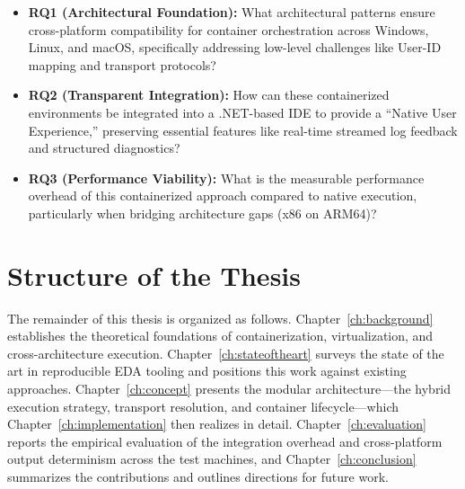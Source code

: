 \begin{itemize}
    \item \textbf{RQ1 (Architectural Foundation):} What architectural patterns ensure cross-platform compatibility for container orchestration across Windows, Linux, and macOS, specifically addressing low-level challenges like User-ID mapping and transport protocols?
    \item \textbf{RQ2 (Transparent Integration):} How can these containerized environments be integrated into a .NET-based IDE to provide a ``Native User Experience,'' preserving essential features like real-time streamed log feedback and structured diagnostics?
    \item \textbf{RQ3 (Performance Viability):} What is the measurable performance overhead of this containerized approach compared to native execution, particularly when bridging architecture gaps (x86 on ARM64)?
\end{itemize}

\section{Structure of the Thesis}
The remainder of this thesis is organized as follows. Chapter~\ref{ch:background} establishes the theoretical foundations of containerization, virtualization, and cross-architecture execution. Chapter~\ref{ch:stateoftheart} surveys the state of the art in reproducible EDA tooling and positions this work against existing approaches. Chapter~\ref{ch:concept} presents the modular architecture---the hybrid execution strategy, transport resolution, and container lifecycle---which Chapter~\ref{ch:implementation} then realizes in detail. Chapter~\ref{ch:evaluation} reports the empirical evaluation of the integration overhead and cross-platform output determinism across the test machines, and Chapter~\ref{ch:conclusion} summarizes the contributions and outlines directions for future work.
